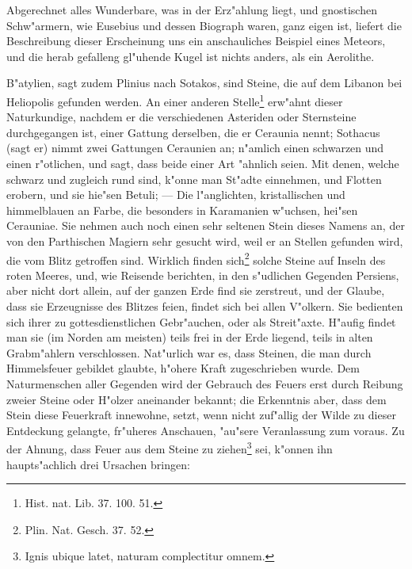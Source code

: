 \documentclass[a4paper, 11pt, oneside, polutonikogreek, german]{article}
\begin{document}
Abgerechnet alles Wunderbare, was in der Erz"ahlung liegt, und gnostischen Schw"armern, wie Eusebius und dessen Biograph waren, ganz eigen ist, liefert die Beschreibung dieser Erscheinung uns ein anschauliches Beispiel eines Meteors, und die herab gefalleng gl"uhende Kugel ist nichts anders, als ein Aerolithe.

B"atylien, sagt zudem Plinius nach Sotakos, sind Steine, die auf dem Libanon bei Heliopolis gefunden werden. An einer anderen Stelle\footnote{Hist. nat. Lib. 37. 100. 51.} erw"ahnt dieser Naturkundige, nachdem er die verschiedenen Asteriden oder Sternsteine durchgegangen ist, einer Gattung derselben, die er Ceraunia nennt; Sothacus (sagt er) nimmt zwei Gattungen Ceraunien an; n"amlich einen schwarzen und einen r"otlichen, und sagt, dass beide einer Art "ahnlich seien. Mit denen, welche schwarz und zugleich rund sind, k"onne man St"adte einnehmen, und Flotten erobern, und sie hie"sen Betuli; --- Die l"anglichten, kristallischen und himmelblauen an Farbe, die besonders in Karamanien w"uchsen, hei"sen Cerauniae. Sie nehmen auch noch einen sehr seltenen Stein dieses Namens an, der von den Parthischen Magiern sehr gesucht wird, weil er an Stellen gefunden wird, die vom Blitz getroffen sind. Wirklich finden sich\footnote{Plin. Nat. Gesch. 37. 52.} solche Steine auf Inseln des roten Meeres, und, wie Reisende berichten, in den s"udlichen Gegenden Persiens, aber nicht dort allein, auf der ganzen Erde find sie zerstreut, und der Glaube, dass sie Erzeugnisse des Blitzes feien, findet sich bei allen V"olkern. Sie bedienten sich ihrer zu gottesdienstlichen Gebr"auchen, oder als Streit"axte. H"aufig findet man sie (im Norden am meisten) teils frei in der Erde liegend, teils in alten Grabm"ahlern verschlossen. Nat"urlich war es, dass Steinen, die man durch Himmelsfeuer gebildet glaubte, h"ohere Kraft zugeschrieben wurde. Dem Naturmenschen aller Gegenden wird der Gebrauch des Feuers erst durch Reibung zweier Steine oder H"olzer aneinander bekannt; die Erkenntnis aber, dass dem Stein diese Feuerkraft innewohne, setzt, wenn nicht zuf"allig der Wilde zu dieser Entdeckung gelangte, fr"uheres Anschauen, "au"sere Veranlassung zum voraus. Zu der Ahnung, dass Feuer aus dem Steine zu ziehen\footnote{Ignis ubique latet, naturam complectitur omnem.} sei, k"onnen ihn haupts"achlich drei Ursachen bringen:
\end{document}
